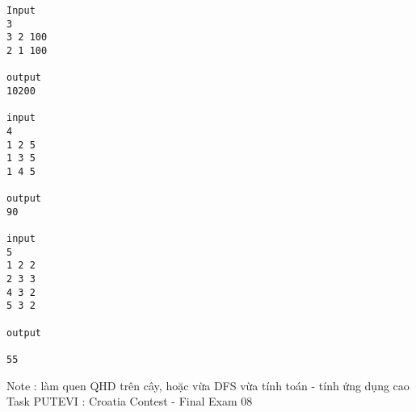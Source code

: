 \begin{verbatim}
Input 
3 
3 2 100 
2 1 100 
 
output 
10200 

input 
4 
1 2 5 
1 3 5 
1 4 5 

output 
90 

input 
5 
1 2 2 
2 3 3 
4 3 2 
5 3 2 
 
output 
 
55
\end{verbatim}

Note : làm quen QHD trên cây, hoặc vừa DFS vừa tính toán - tính ứng dụng cao
\\Task PUTEVI : Croatia Contest - Final Exam 08